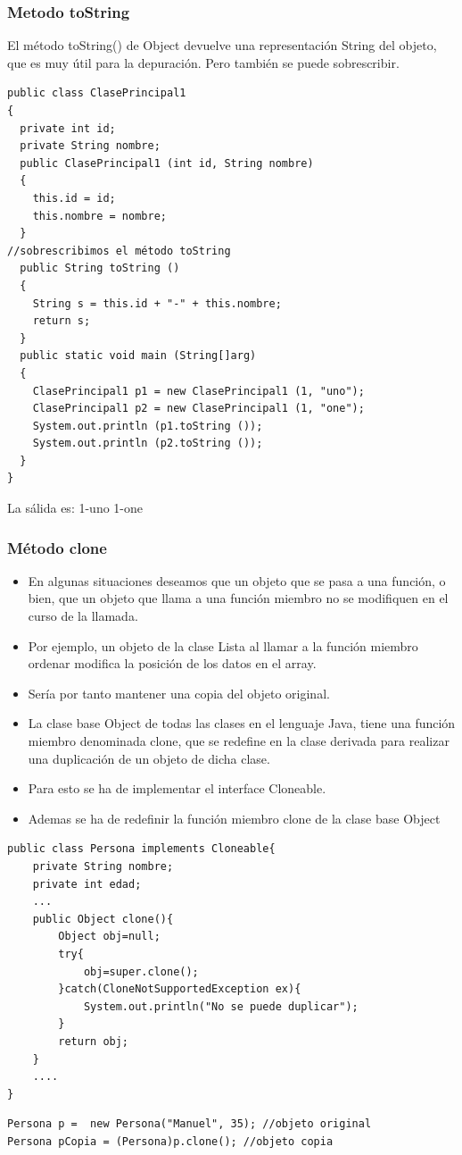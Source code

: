 \documentclass{beamer}
\begin{document}
\begin{frame}[fragile]
\frametitle{Metodo toString}
El método toString() de Object devuelve una representación  String del objeto, que es muy útil para la depuración. Pero también se puede sobrescribir.
\begin{tiny}
\begin{verbatim}
public class ClasePrincipal1
{
  private int id;
  private String nombre;
  public ClasePrincipal1 (int id, String nombre)
  {
    this.id = id;
    this.nombre = nombre;
  }
//sobrescribimos el método toString
  public String toString ()
  {
    String s = this.id + "-" + this.nombre;
    return s;
  }
  public static void main (String[]arg)
  {
    ClasePrincipal1 p1 = new ClasePrincipal1 (1, "uno");
    ClasePrincipal1 p2 = new ClasePrincipal1 (1, "one");
    System.out.println (p1.toString ());
    System.out.println (p2.toString ());
  }
}
\end{verbatim}
\end{tiny}
\pause
\begin{center}
La sálida es: \alert{1-uno 1-one}
\end{center}

\end{frame}


\begin{frame}[fragile]
\begin{tiny}
\frametitle{Método clone}
\begin{itemize}[<+-|alert@+>]
\item En algunas situaciones deseamos que un objeto que se pasa a una función, o bien, que un objeto que llama a una función miembro no se modifiquen en el curso de la llamada.
\item  Por ejemplo, un objeto de la clase Lista al llamar a la función miembro ordenar modifica la posición de los datos en el array.
\item Sería por tanto mantener una copia del objeto original.
\item La clase base Object de todas las clases en el lenguaje Java, tiene una función miembro denominada clone, que se redefine en la clase derivada para realizar una duplicación de un objeto de dicha clase.  
\item Para esto se ha de implementar el interface Cloneable.
\item Ademas se ha de redefinir la función miembro clone de la clase base Object
\end{itemize}
\pause
\begin{verbatim}
public class Persona implements Cloneable{
    private String nombre;
    private int edad;
    ...
    public Object clone(){
        Object obj=null;
        try{
            obj=super.clone();
        }catch(CloneNotSupportedException ex){
            System.out.println("No se puede duplicar");
        }
        return obj;
    }
    ....
}
\end{verbatim}
\pause
\begin{verbatim}
Persona p =  new Persona("Manuel", 35); //objeto original
Persona pCopia = (Persona)p.clone(); //objeto copia
\end{verbatim}
\end{tiny}
\end{frame}
\end{document}
